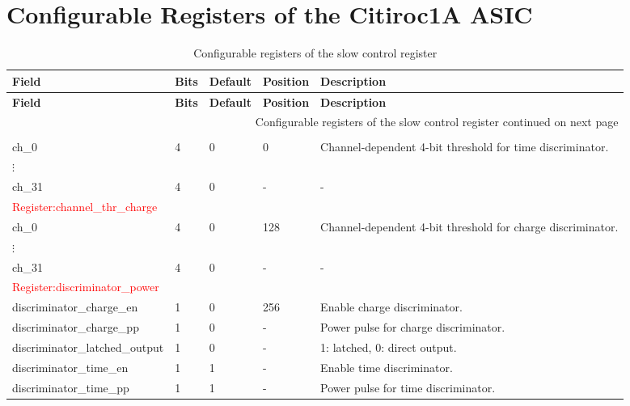 \chapter{Configurable Registers of the Citiroc1A ASIC}\label{cha:Citiroc1A_register}

\begin{longtable}{|p{6cm}|p{1cm}|p{1.4cm}|p{1.8cm}|p{5cm}|}
    
    \caption{Configurable registers of the slow control register\autocite{InternalcommunicationKarl} \label{tab:slow_control_register}} \\ \hline
    \hline
\textbf{Field} & \textbf{Bits} & \textbf{Default} & \textbf{Position} & \textbf{Description} \\ \hline
\endfirsthead

\hline
\textbf{Field} & \textbf{Bits} & \textbf{Default} & \textbf{Position } & \textbf{Description} \\ \hline
\endhead

\hline
\multicolumn{5}{r}{{Configurable registers of the slow control register continued on next page}} \\
\endfoot

\hline
\endlastfoot

\multicolumn{5}{|l|}{\textcolor{red}{Register:channel\_thr\_time}} \\ \hline
ch\_0       & 4  & 0 & 0   & Channel-dependent 4-bit threshold for time discriminator. \\ \hline
 $\vdots$ & &   &  & \\ \hline %
ch\_31      & 4  & 0 & -   & - \\ \hline
\multicolumn{5}{|l|}{\textcolor{red}{Register:channel\_thr\_charge }} \\ \hline
ch\_0     & 4  & 0 & 128 & Channel-dependent 4-bit threshold for charge discriminator. \\ \hline
$\vdots$ & &   &  & \\ \hline %
 ch\_31    & 4  & 0 & -   & - \\ \hline

\multicolumn{5}{|l|}{\textcolor{red}{Register:discriminator\_power}} \\ \hline
discriminator\_charge\_en      & 1  & 0 & 256 & Enable charge discriminator. \\ \hline
discriminator\_charge\_pp      & 1  & 0 & -   & Power pulse for charge discriminator. \\ \hline
discriminator\_latched\_output & 1  & 0 & -   & 1: latched, 0: direct output. \\ \hline
discriminator\_time\_en        & 1  & 1 & -   & Enable time discriminator. \\ \hline
discriminator\_time\_pp        & 1  & 1 & -   & Power pulse for time discriminator. \\ \hline



\end{longtable}
